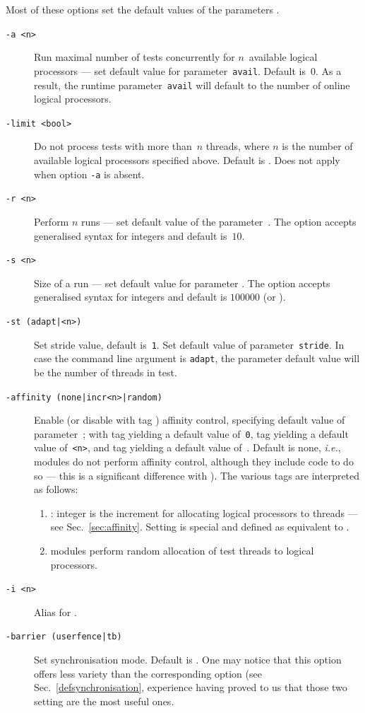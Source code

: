 Most of these options set the default values of the parameters
.
\begin{description}
\item[{\tt -a <n>}]Run maximal number of tests concurrently for $n$~available
logical processors ---
set default value for parameter~\texttt{avail}.
Default is~$0$. As a result,
the runtime parameter~\texttt{avail}
will default to the number of online logical processors.
\item[{\tt -limit <bool>}] Do not process tests with more than~$n$
threads, where $n$ is the number of available logical processors
specified above. Default is .
Does not apply  when option \texttt{-a} is absent.
\item[{\tt -r <n>}] Perform $n$ runs --- set default value
of the parameter~.
The option accepts generalised syntax for integers and
default is~$10$.
\item[{\tt -s <n>}]Size of a run --- set default value for
parameter .
The option accepts generalised syntax for integers and
default is $100000$ (or ).
\item[{\tt -st (adapt|<n>)}]
Set stride value, default is~\texttt{1}.
Set default value of parameter~\texttt{stride}.
In case the command line argument is \texttt{adapt}, the parameter default
value will be the number of threads in test.

\item[{\tt -affinity (none|incr<n>|random)}]
Enable (or disable with tag ) affinity control,
specifying default value of parameter~;
with tag  yielding a default value of~\texttt{0},
tag  yielding a default value of~\texttt{<n>},
and tag  yielding a default value of~.
Default is none, \emph{i.e.}, modules do not perform affinity control,
although they include code to do so ---
this is a significant difference with
).
The various tags are interpreted as follows:
\begin{enumerate}
\item {}:
integer  is the increment  for allocating logical
processors to threads --- see Sec.~\ref{sec:affinity}.
Setting  is special and defined as
equivalent to .
\item {} modules perform random allocation of
test threads to logical processors.
\end{enumerate}
\item[{\tt -i <n>}] Alias for .
\item[{\tt -barrier (userfence|tb)}]
Set synchronisation mode. Default is .
One may notice that this option offers less variety than
the corresponding \litmus{} option (see Sec.~\ref{defsynchronisation},
experience having proved to us
that those two setting are the most useful ones.
\end{description}

